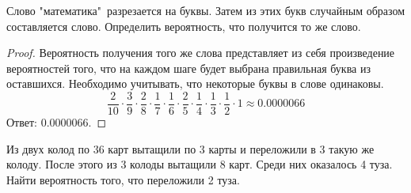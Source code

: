 
\renewcommand*{\proofname}{Решение}

\begin{problem}
	Слово "математика"\ разрезается на буквы. Затем из этих букв случайным образом составляется слово. Определить вероятность, что получится то же слово.
\end{problem}

\begin{proof}
	Вероятность получения того же слова представляет из себя произведение вероятностей того, что на каждом шаге будет выбрана правильная буква из оставшихся. Необходимо учитывать, что некоторые буквы в слове одинаковы.
	\[	
		\frac{2}{10}\cdot\frac{3}{9}\cdot\frac{2}{8}\cdot\frac{1}{7}\cdot\frac{1}{6}\cdot\frac{2}{5}\cdot\frac{1}{4}\cdot\frac{1}{3}\cdot\frac{1}{2}\cdot1\approx0.0000066
	\]
	Ответ: $0.0000066$.
\end{proof}

\begin{problem}
	Из двух колод по 36 карт вытащили по 3 карты и переложили в 3 такую же колоду. После этого из 3 колоды вытащили 8 карт. Среди них оказалось 4 туза. Найти вероятность того, что переложили 2 туза.
\end{problem}

